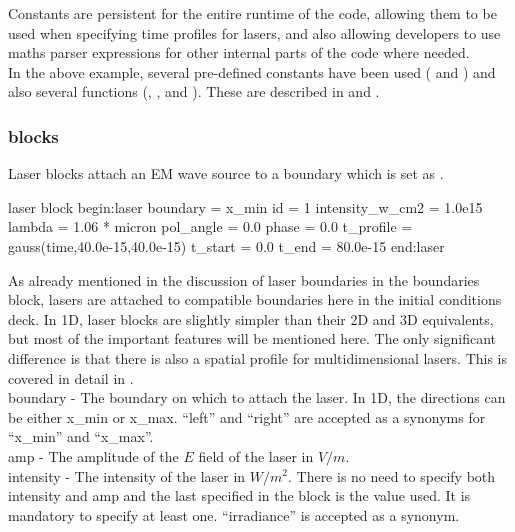Constants are persistent for the entire runtime of the code,
allowing them to be used when specifying time profiles for lasers, and also
allowing developers to use maths parser expressions for other internal parts of
the code where needed.\\

In the above example, several pre-defined constants have been used
( and ) and also several functions
(, ,  and
). These are described in  and
.

\subsubsection{ blocks}
\label{sec:lasers}
Laser blocks attach an EM wave source to a boundary which is set as
.

\begin{lboxverbatim}{laser block}
begin:laser
   boundary = x_min
   id = 1
   intensity_w_cm2 = 1.0e15
   lambda = 1.06 * micron
   pol_angle = 0.0
   phase = 0.0
   t_profile = gauss(time,40.0e-15,40.0e-15)
   t_start = 0.0
   t_end = 80.0e-15
end:laser
\end{lboxverbatim}

As already mentioned in the discussion of laser boundaries in the boundaries
block, lasers are attached to compatible boundaries here in the initial
conditions deck. In 1D, laser blocks are slightly simpler than their 2D and 3D
equivalents, but most of the important features will be mentioned here. The
only significant difference is that there is also a spatial profile for
multidimensional lasers. This is covered in detail in
.\\

{\emphtext boundary} - The boundary on which to attach the laser.
In 1D, the directions can be either x\_min or x\_max.  ``left'' and ``right''
are accepted as a synonyms for ``x\_min'' and ``x\_max''.\\

{\emphtext amp} - The amplitude of the $E$ field of the laser in $V/m$.\\

{\emphtext intensity} - The intensity of the laser in $W/m^2$.
There is no need to specify both intensity and amp and the last specified
in the block is the value used. It is mandatory to specify at least one.
``irradiance'' is accepted as a synonym.\\

